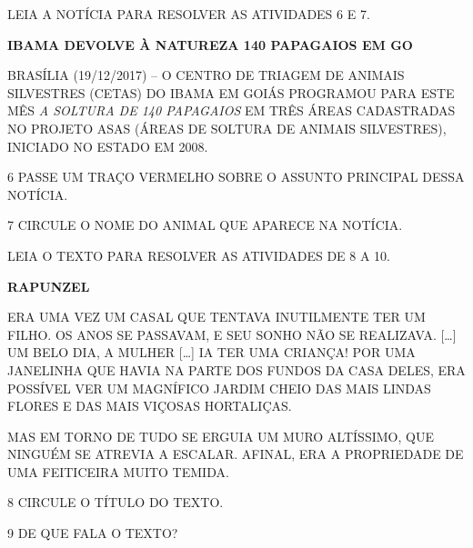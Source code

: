 LEIA A NOTÍCIA PARA RESOLVER AS ATIVIDADES 6 E 7.

\begin{myquote}
\textbf{IBAMA DEVOLVE À NATUREZA 140 PAPAGAIOS EM GO}

BRASÍLIA (19/12/2017) -- O CENTRO DE TRIAGEM DE ANIMAIS SILVESTRES
(CETAS) DO IBAMA EM GOIÁS PROGRAMOU PARA ESTE MÊS \emph{A SOLTURA DE 140
PAPAGAIOS} EM TRÊS ÁREAS CADASTRADAS NO PROJETO ASAS (ÁREAS DE SOLTURA
DE ANIMAIS SILVESTRES), INICIADO NO ESTADO EM 2008.~

\end{myquote}

\num{6} PASSE UM TRAÇO VERMELHO SOBRE O ASSUNTO PRINCIPAL DESSA NOTÍCIA.

\vspace{0.5cm}

\num{7} CIRCULE O NOME DO ANIMAL QUE APARECE NA NOTÍCIA. 

\vspace{0.5cm}

LEIA O TEXTO PARA RESOLVER AS ATIVIDADES DE 8 A 10.

\begin{myquote}
\textbf{RAPUNZEL}

ERA UMA VEZ UM CASAL QUE TENTAVA INUTILMENTE TER UM
FILHO. OS ANOS SE PASSAVAM, E SEU SONHO NÃO SE REALIZAVA. [\ldots{}] UM
BELO DIA, A MULHER [\ldots{}] IA TER UMA
CRIANÇA! POR UMA JANELINHA QUE HAVIA NA PARTE DOS FUNDOS DA CASA DELES,
ERA POSSÍVEL VER UM MAGNÍFICO JARDIM CHEIO DAS MAIS
LINDAS FLORES E DAS MAIS VIÇOSAS HORTALIÇAS.

MAS EM TORNO DE TUDO SE ERGUIA UM MURO ALTÍSSIMO, QUE NINGUÉM SE ATREVIA
A ESCALAR. AFINAL, ERA A PROPRIEDADE DE UMA FEITICEIRA MUITO TEMIDA.

\end{myquote}

\num{8} CIRCULE O TÍTULO DO TEXTO. 

\vspace{0.3cm}

\num{9} DE QUE FALA O TEXTO?


